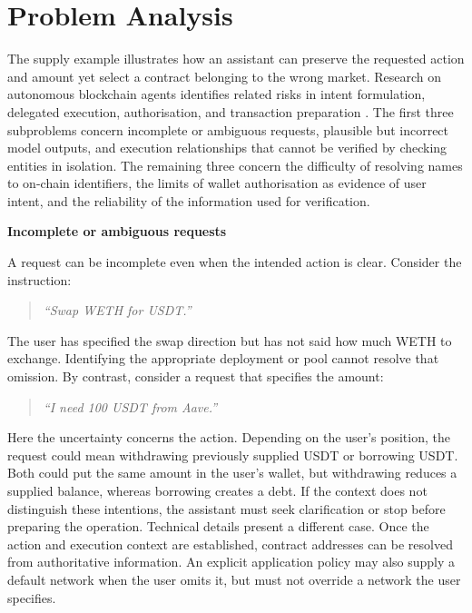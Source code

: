 \section{Problem Analysis}
\label{sec:problem_analysis}

\providecommand{\problemheading}[1]{%
  \par\addvspace{0.8\baselineskip}%
  \noindent\textbf{#1}\par\nobreak\smallskip\nobreak
  \noindent\ignorespaces}

The supply example illustrates how an assistant can preserve the requested
action and amount yet select a contract belonging to the wrong market.
Research on autonomous blockchain agents identifies related risks in intent
formulation, delegated execution, authorisation, and transaction preparation
\cite{alqithamiAutonomousAgentsBlockchains2026}. The first three subproblems concern incomplete or ambiguous requests,
plausible but incorrect model outputs, and execution relationships that
cannot be verified by checking entities in isolation. The remaining three
concern the difficulty of resolving names to on-chain identifiers, the
limits of wallet authorisation as evidence of user intent, and the
reliability of the information used for verification.

\problemheading{Incomplete or ambiguous requests}
A request can be incomplete even when the intended action is clear.
Consider the instruction:

\begin{quote}
\textit{``Swap WETH for USDT.''}
\end{quote}

The user has specified the swap direction but has not said how much WETH
to exchange. Identifying the appropriate deployment or pool cannot resolve
that omission. By contrast, consider a request that specifies the amount:

\begin{quote}
\textit{``I need 100 USDT from Aave.''}
\end{quote}

Here the uncertainty concerns the action. Depending on the user's position,
the request could mean withdrawing previously supplied USDT or borrowing
USDT. Both could put the same amount in the user's wallet, but withdrawing
reduces a supplied balance, whereas borrowing creates a debt. If the
context does not distinguish these intentions, the assistant must seek
clarification or stop before preparing the operation. Technical details present a different case. Once the action and execution
context are established, contract addresses can be resolved from
authoritative information. An explicit application policy may also supply
a default network when the user omits it, but must not override a network
the user specifies.

